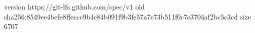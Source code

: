 version https://git-lfs.github.com/spec/v1
oid sha256:8549ee4befe8ffeccc9b4e84b091f9b3fe57a7c73b511f0c7e3704af2bc5c3cd
size 6707
